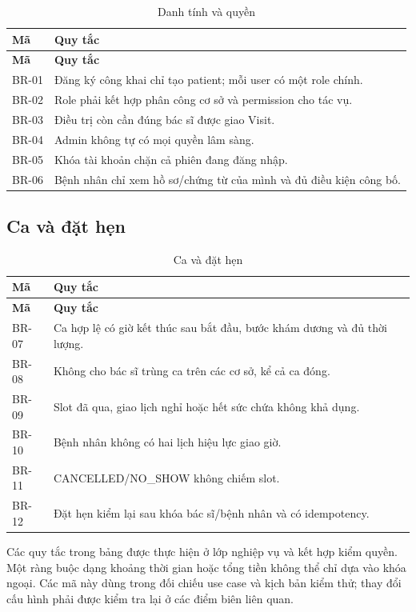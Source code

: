 {\small\setlength{\tabcolsep}{3pt}\renewcommand{\arraystretch}{1.12}
\begin{longtable}{@{}L{\textwidth-0.72pt\relax} L{\textwidth-5.28pt\relax}@{}}
\caption{Danh tính và quyền}\\
\toprule
\textbf{Mã} & \textbf{Quy tắc}\\\midrule
\endfirsthead
\toprule
\textbf{Mã} & \textbf{Quy tắc}\\\midrule
\endhead
\bottomrule\endlastfoot
BR-01 & Đăng ký công khai chỉ tạo patient; mỗi user có một role chính.\allowbreak{}\\[3pt]
BR-02 & Role phải kết hợp phân công cơ sở và permission cho tác vụ.\allowbreak{}\\[3pt]
BR-03 & Điều trị còn cần đúng bác sĩ được giao Visit.\allowbreak{}\\[3pt]
BR-04 & Admin không tự có mọi quyền lâm sàng.\allowbreak{}\\[3pt]
BR-05 & Khóa tài khoản chặn cả phiên đang đăng nhập.\allowbreak{}\\[3pt]
BR-06 & Bệnh nhân chỉ xem hồ sơ/\allowbreak{}chứng từ của mình và đủ điều kiện công bố.\allowbreak{}\\[3pt]
\end{longtable}}

\subsection{Ca và đặt hẹn}

{\small\setlength{\tabcolsep}{3pt}\renewcommand{\arraystretch}{1.12}
\begin{longtable}{@{}L{\textwidth-0.72pt\relax} L{\textwidth-5.28pt\relax}@{}}
\caption{Ca và đặt hẹn}\\
\toprule
\textbf{Mã} & \textbf{Quy tắc}\\\midrule
\endfirsthead
\toprule
\textbf{Mã} & \textbf{Quy tắc}\\\midrule
\endhead
\bottomrule\endlastfoot
BR-07 & Ca hợp lệ có giờ kết thúc sau bắt đầu, bước khám dương và đủ thời lượng.\allowbreak{}\\[3pt]
BR-08 & Không cho bác sĩ trùng ca trên các cơ sở, kể cả ca đóng.\allowbreak{}\\[3pt]
BR-09 & Slot đã qua, giao lịch nghỉ hoặc hết sức chứa không khả dụng.\allowbreak{}\\[3pt]
BR-10 & Bệnh nhân không có hai lịch hiệu lực giao giờ.\allowbreak{}\\[3pt]
BR-11 & CANCELLED/\allowbreak{}NO\_\allowbreak{}SHOW không chiếm slot.\allowbreak{}\\[3pt]
BR-12 & Đặt hẹn kiểm lại sau khóa bác sĩ/\allowbreak{}bệnh nhân và có idempotency.\allowbreak{}\\[3pt]
\end{longtable}}
Các quy tắc trong bảng được thực hiện ở lớp nghiệp vụ và kết hợp kiểm quyền.\allowbreak{} Một ràng buộc dạng khoảng thời gian hoặc tổng tiền không thể chỉ dựa vào khóa ngoại.\allowbreak{} Các mã này dùng trong đối chiếu use case và kịch bản kiểm thử; thay đổi cấu hình phải được kiểm tra lại ở các điểm biên liên quan.\allowbreak{}

